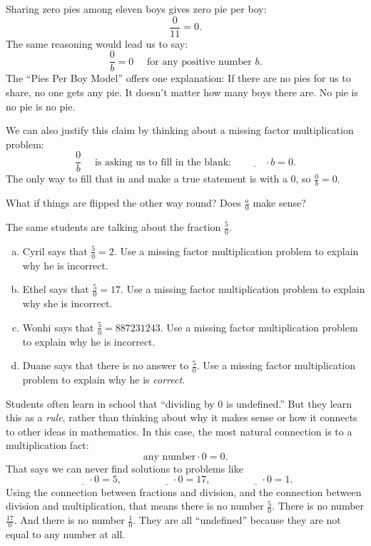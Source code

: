 Sharing zero pies among eleven boys gives zero pie per boy:
\[
\frac 0 {11} = 0.
\]
The same reasoning would lead us to say:
\[
\frac 0 b = 0 \quad \text{ for any positive number } b.
\]
The ``Pies Per Boy Model'' offers one explanation: If there are no pies for us to share, no one gets any pie.  It doesn't matter how many boys there are.  No pie is no pie is no pie.

We can also justify this claim by thinking about a missing factor multiplication problem:
\[
\frac 0 b 
\quad 
\text{ is asking us to fill in the blank: }
\quad
\underline{\qquad} \cdot b = 0.
\]
The only way to fill that in and make a true statement is with a 0, so $\frac 0 b = 0$.



What if things are flipped the other way round?
Does $\frac{a}0$ make sense?  

\begin{thinkpair*}
The same students are talking about the fraction $\frac 5 0$.
\begin{enumerate}[(a)]
\item
Cyril says that $\frac 5 0  = 2$.  Use a missing factor multiplication problem to explain why he is incorrect.\\

\item
Ethel says that $\frac 5 0 = 17$.  Use a missing factor multiplication problem to explain why she is incorrect.\\

\item
Wonhi says that $\frac 5 0  = 887231243$.  Use a missing factor multiplication problem to explain why he is incorrect.\\

\item
Duane says that there is no answer to $\frac 5 0$.  Use a missing factor multiplication problem to explain why he is \emph{correct}.
\end{enumerate}
\end{thinkpair*}

Students often learn in school that ``dividing by 0 is undefined.'' But they learn this as a \emph{rule}, rather than thinking about why it makes sense or how it connects to other ideas in mathematics.  In this case, the most natural connection is to a multiplication fact:
\[
\text{any number} \cdot 0 = 0.
\]
That says we can never find solutions to problems like
 \[
\underline{\quad} \cdot 0 = 5,
\qquad\qquad
\underline{\quad} \cdot 0 = 17,
\qquad\qquad
\underline{\quad} \cdot 0 = 1.
\]
Using the connection between fractions and division, and the connection between division and multiplication, that means there is no number $\frac 5 0$.  There is no number $\frac {17}0$.  And there is no number $\frac 1 0$.  They are all ``undefined'' because they are not equal to any number at all.



